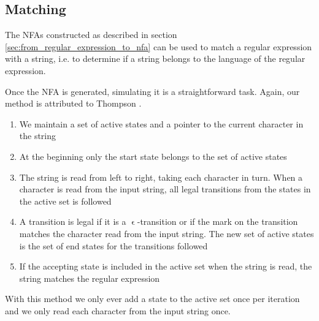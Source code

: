 \subsection{Matching}

The NFAs constructed as described in section
\vref{sec:from_regular_expression_to_nfa} can be used to match a
regular expression with a string, i.e. to determine if a string belongs
to the language of the regular expression. 

Once the NFA is generated, simulating it is a straightforward
task. Again, our method is attributed to Thompson
\cite{Thompson1968}. 
\begin{enumerate}
    \item We maintain a set of active states and a pointer
    to the current character in the string
    \item At the beginning only the
    start state belongs to the set of active states
    \item The string is read
    from left to right, taking each character in turn. When a character is
    read from the input string, all legal transitions from the states in
    the active set is followed
    \item A transition is legal if it is a
    $\upvarepsilon$-transition or if the mark on the transition matches
    the character read from the input string. The new set of active states
    is the set of end states for the transitions followed
    \item If the
    accepting state is included in the active set when the string is read,
    the string matches the regular expression
\end{enumerate}

With this method we only ever add a state to the active set once per
iteration and we only read each character from the input string once.


